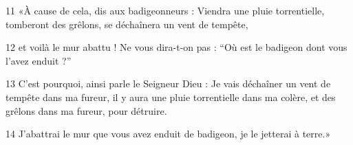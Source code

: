 
11 «À cause de cela, dis aux badigeonneurs : Viendra une pluie torrentielle, tomberont des grêlons, se déchaînera un vent de tempête,

12 et voilà le mur abattu ! Ne vous dira-t-on pas : “Où est le badigeon dont vous l’avez enduit ?”

13 C’est pourquoi, ainsi parle le Seigneur Dieu : Je vais déchaîner un vent de tempête dans ma fureur, il y aura une pluie torrentielle dans ma colère, et des grêlons dans ma fureur, pour détruire.

14 J’abattrai le mur que vous avez enduit de badigeon, je le jetterai à terre.»